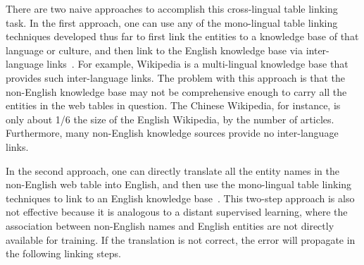 There are two naive approaches to accomplish this cross-lingual table linking task.
In the first approach, one can use any of the mono-lingual table linking techniques developed thus far
to first link the entities to a knowledge base of that language or culture, and then link to
the English knowledge base via inter-language links~\cite{tsai2016cross}.
For example, Wikipedia is a multi-lingual knowledge base that provides such inter-language links. 
The problem with this approach is that the non-English knowledge base may not be
comprehensive enough to carry all the entities in the web tables in question.
The Chinese Wikipedia, for instance, is only about 1/6 the size of the English
Wikipedia, by the number of articles. Furthermore, many non-English knowledge sources
provide no inter-language links. 

In the second approach, one can directly translate all the entity names in
the non-English web table into English,
and then use the mono-lingual table linking techniques to link to 
an English knowledge base~\cite{mcnamee2011cross}.
This two-step approach is also not effective because
it is analogous to a distant supervised learning, where the association between
non-English names and English entities are not directly available for training. If the translation is not correct, the error will propagate in the following linking steps.





